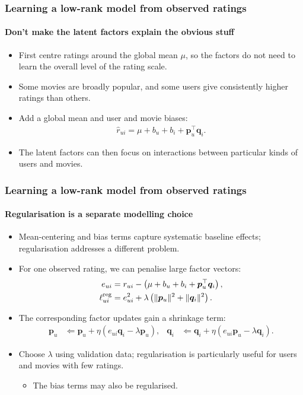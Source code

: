 \documentclass[]{article}
\begin{document}
\begin{frame}
\frametitle{Learning a low-rank model from observed ratings}
\framesubtitle{Don't make the latent factors explain the obvious stuff}
\begin{itemize}
	\item<+-> First centre ratings around the global mean $\mu$, so the factors do not need to learn the overall level of the rating scale.
	\item<+-> Some movies are broadly popular, and some users give consistently higher ratings than others.
	\item<+-> Add a global mean and user and movie biases:
	\begin{align*}
		\hat r_{ui}=\mu+b_u+b_i+\bm p_u^\top\bm q_i.
	\end{align*}
	\item<+-> The latent factors can then focus on interactions between particular kinds of users and movies.
\end{itemize}
\end{frame}

\begin{frame}
\frametitle{Learning a low-rank model from observed ratings}
\framesubtitle{Regularisation is a separate modelling choice}
\begin{itemize}
	\item<+-> Mean-centering and bias terms capture systematic baseline effects; regularisation addresses a different problem.
	\item<+-> For one observed rating, we can penalise large factor vectors:
	\begin{align*}
		e_{ui}&=r_{ui}-\left(\mu+b_u+b_i+\bm p_u^\top\bm q_i\right),\\
		\ell_{ui}^{\rm reg}&=e_{ui}^2+\lambda\left(\lVert\bm p_u\rVert^2+\lVert\bm q_i\rVert^2\right).
	\end{align*}
	\item<+-> The corresponding factor updates gain a shrinkage term:
	\begin{align*}
		\bm p_u&\Leftarrow\bm p_u+\eta(e_{ui}\bm q_i-\lambda\bm p_u), &
		\bm q_i&\Leftarrow\bm q_i+\eta(e_{ui}\bm p_u-\lambda\bm q_i).
	\end{align*}
	\item<+-> Choose $\lambda$ using validation data; regularisation is particularly useful for users and movies with few ratings.
	\begin{itemize}
		\item<+-> The bias terms may also be regularised.
	\end{itemize}
\end{itemize}
\end{frame}
\end{document}
